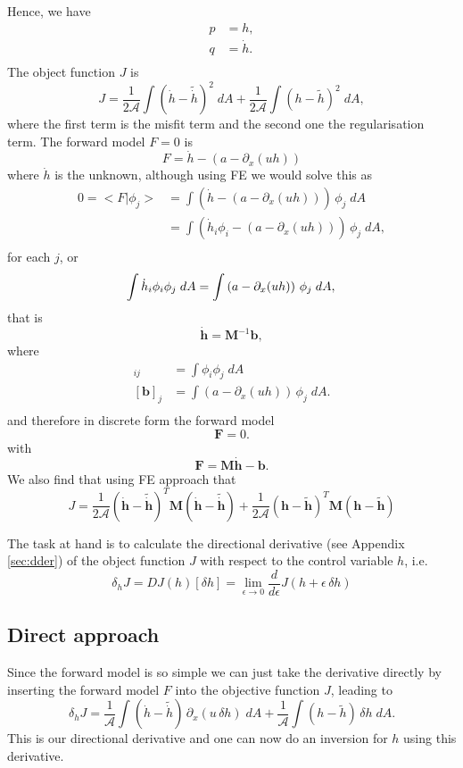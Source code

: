 \documentclass[10pt,a4paper]{book}
\newcommand{\p}{\partial}
\begin{document}
Hence, we have
\begin{align}
  p&=h ,\\
  q&=\dot{h} .\\
\end{align}
The object function $J$ is
\[
J= \frac{1}{2 \mathcal{A}}  \int \left (\dot{h} - \tilde{\dot{h}} \right )^2 \; dA + \frac{1}{2 \mathcal{A}} \int \left (  h - \tilde{h} \right )^2 \; dA , 
\]
where the first term is the misfit term and the second one the regularisation term. The forward model $F=0$ is
\[
 F= \dot{h}  - \left ( a - \p_x ( u h ) \right ) 
 \]
where $\dot{h}$ is the unknown,  although using FE we would solve this as
\begin{align*}
  0=<F | \phi_j > &= \int \left (\dot{h}  - \left ( a - \p_x ( u h ) \right ) \right ) \, \phi_j \; dA  \\
    &= \int \left (\dot{h}_i \phi_i  - \left ( a - \p_x ( u  h ) \right ) \right ) \, \phi_j \; dA , \\
\end{align*}
for each $j$, or
\[
 \int \dot{h}_i \phi_i  \phi_j \; dA = \int \left ( a - \p_x ( u  h ) \right ) \, \phi_j \; dA , \\
\]
that is
\[
\dot{\bm{h}} = \bm{M}^{-1} \bm{b},
\]
where
\begin{align}
  [\bm{M}]_{ij}&= \int \phi_i \phi_j \; dA \\
  [\bm{b}]_j&= \int \left ( a - \p_x ( u  h ) \right ) \, \phi_j \; dA  .\\
\end{align}
and therefore in discrete form the forward model 
\[
\bm{F}= 0.
\]
with
\[
\bm{F}= \bm{M} \dot{\bm{h}} - \bm{b} .
\]
We also find that using FE approach that
\[
    J = \frac{1}{2 \mathcal{A}} (\bm{\dot{h}}-\bm{\tilde{\dot{h}}})^T \bm{M}  (\bm{\dot{h}}-\bm{\tilde{\dot{h}}}) + \frac{1}{2\mathcal{A}} (\bm{h}-\bm{\tilde{h}})^T \bm{M}  (\bm{h}-\bm{\tilde{h}})
\]


The task at hand is to calculate the directional derivative (see Appendix \ref{sec:dder}) of the
object function $J$ with respect to the control variable $h$, i.e.\
\[
\delta_h J = D J(h)[\delta h]= \lim_{\epsilon \to 0} \frac{d}{d \epsilon} J(h+\epsilon \, \delta h)
\]




\subsection{Direct approach}
Since the forward model is so simple we can just take the derivative
directly by inserting the forward model $F$ into the objective
function $J$, leading to
\begin{equation}
\delta_h J = \frac{1}{\mathcal{A}} \int \left (\dot{h} -
\tilde{\dot{h}} \right ) \, \p_x (u \,\delta h) \; dA +
\frac{1}{\mathcal{A}} \int \left ( h - \tilde{h} \right ) \, \delta h \; dA .
\label{eq:djH}
\end{equation}
This is our directional derivative and one can now do an inversion for
$h$ using this derivative.
\end{document}
